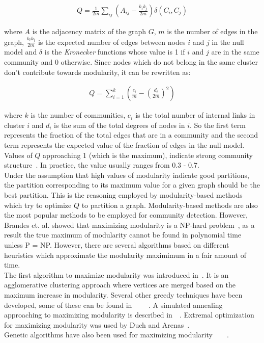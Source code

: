 \begin{spacing}{1.5}
\begin{align}
Q = \frac{1}{2m}\displaystyle\sum_{ij}\left(A_{ij} - \frac{k_i k_j}{2m}\right) \delta(C_i, C_j)
\end{align}

where $A$ is the adjacency matrix of the graph $G$, $m$ is the number of edges in the graph, $\frac{k_i k_j}{2m}$ is the expected number of edges between nodes $i$ and $j$ in the null model and $\delta$ is the \emph{Kronecker} functions whose value is 1 if $i$ and $j$ are in the same community and 0 otherwise. Since nodes which do not belong in the same cluster don't contribute towards modularity, it can be rewritten as:

\begin{align}
Q = \displaystyle\sum_{i = 1}^k\left(\frac{e_i}{m} - \left(\frac{d_i}{2m}\right)^2\right)
\end{align}

where $k$ is the number of communities, $e_i$ is the total number of internal links in cluster $i$ and $d_i$ is the sum of the total degrees of nodes in $i$. So the first term represents the fraction of the total edges that are in a community and the second term represents the expected value of the fraction of edges in the null model. Values of $Q$ approaching 1 (which is the maximum), indicate strong community structure~\cite{PhysRevE.69.026113}. In practice, the value usually ranges from 0.3 - 0.7. \\
\indent Under the assumption that high values of modularity indicate good partitions, the partition corresponding to its maximum value for a given graph should be the best partition. This is the reasoning employed by modularity-based methods which try to optimize $Q$ to partition a graph. Modularity-based methods are also the most popular methods to be employed for community detection. However, Brandes et. al. showed that maximizing modularity is a NP-hard problem~\cite{10.1109/TKDE.2007.190689}, as a result the true maximum of modularity cannot be found in polynomial time unless P = NP. However, there are several algorithms based on different heuristics which approximate the modularity maximimum in a fair amount of time.\\
\indent The first algorithm to maximize modularity was introduced in~\cite{newman03fast}. It is an agglomerative clustering approach where vertices are merged based on the maximum increase in modularity. Several other greedy techniques have been developed, some of these can be found in~\cite{blondel2008fuc}~\cite{Clauset2004}~\cite{Newman06062006}~\cite{PhysRevE.74.016107} . A simulated annealing approaching to maximizing modularity is described in~\cite{PhysRevE.70.025101}~\cite{PhysRevE.71.046101}. Extremal optimization for maximizing modularity was used by Duch and Arenas~\cite{duch-2005-72}.\\
\indent Genetic algorithms have also been used for maximizing modularity~\cite{Tasgin06gaCommunityDetection}~\cite{2008ppsnpizzuti}~\cite{6045331}~\cite{Pizzuti:2012:BDM:2245276.2245321}.


\end{spacing}
